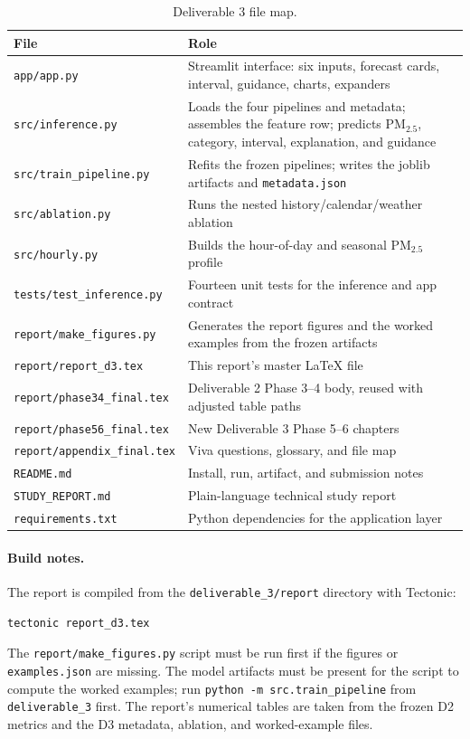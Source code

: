 \begin{table}[htbp]
\centering
\footnotesize
\begin{tabular}{@{}L{5.4cm}L{9.2cm}@{}}
\toprule
\textbf{File} & \textbf{Role} \\
\midrule
\texttt{app/app.py} & Streamlit interface: six inputs, forecast cards, interval,
guidance, charts, expanders \\
\texttt{src/inference.py} & Loads the four pipelines and metadata; assembles the
feature row; predicts PM$_{2.5}$, category, interval, explanation, and guidance \\
\texttt{src/train\_pipeline.py} & Refits the frozen pipelines; writes the joblib
artifacts and \texttt{metadata.json} \\
\texttt{src/ablation.py} & Runs the nested history/calendar/weather ablation \\
\texttt{src/hourly.py} & Builds the hour-of-day and seasonal PM$_{2.5}$ profile \\
\texttt{tests/test\_inference.py} & Fourteen unit tests for the inference and app
contract \\
\texttt{report/make\_figures.py} & Generates the report figures and the worked
examples from the frozen artifacts \\
\texttt{report/report\_d3.tex} & This report's master LaTeX file \\
\texttt{report/phase34\_final.tex} & Deliverable 2 Phase 3--4 body, reused with
adjusted table paths \\
\texttt{report/phase56\_final.tex} & New Deliverable 3 Phase 5--6 chapters \\
\texttt{report/appendix\_final.tex} & Viva questions, glossary, and file map \\
\texttt{README.md} & Install, run, artifact, and submission notes \\
\texttt{STUDY\_REPORT.md} & Plain-language technical study report \\
\texttt{requirements.txt} & Python dependencies for the application layer \\
\bottomrule
\end{tabular}
\caption{Deliverable 3 file map.}
\label{tab:filemap}
\end{table}

\paragraph{Build notes.} The report is compiled from the
\texttt{deliverable\_3/report} directory with Tectonic:
\begin{verbatim}
tectonic report_d3.tex
\end{verbatim}
The \texttt{report/make\_figures.py} script must be run first if the figures or
\texttt{examples.json} are missing. The model artifacts must be present for the
script to compute the worked examples; run \texttt{python -m src.train\_pipeline}
from \texttt{deliverable\_3} first. The report's numerical tables are taken from
the frozen D2 metrics and the D3 metadata, ablation, and worked-example files.
